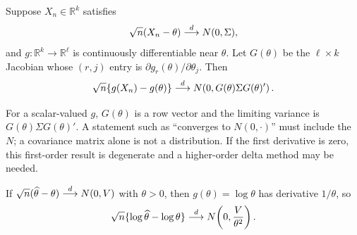 \begin{theorem}
Suppose $X_n\in\mathbb R^k$ satisfies
\[
  \sqrt n(X_n-\theta)\overset{d}{\longrightarrow} N(0,\Sigma),
\]
and $g:\mathbb R^k\to\mathbb R^\ell$ is continuously differentiable near
$\theta$.  Let $G(\theta)$ be the $\ell\times k$ Jacobian whose $(r,j)$ entry
is $\partial g_r(\theta)/\partial\theta_j$.  Then
\[
  \sqrt n\{g(X_n)-g(\theta)\}
  \overset{d}{\longrightarrow} N\!\left(0,G(\theta)\Sigma G(\theta)'\right).
\]
\end{theorem}

For a scalar-valued $g$, $G(\theta)$ is a row vector and the limiting variance
is $G(\theta)\Sigma G(\theta)'$.  A statement such as ``converges to
$N(0,\cdot)$'' must include the $N$; a covariance matrix alone is not a
distribution.  If the first derivative is zero, this first-order result is
degenerate and a higher-order delta method may be needed.

\begin{example}
If $\sqrt n(\widehat\theta-\theta)\overset{d}{\longrightarrow} N(0,V)$ with $\theta>0$, then
$g(\theta)=\log\theta$ has derivative $1/\theta$, so
\[
  \sqrt n\{\log\widehat\theta-\log\theta\}
  \overset{d}{\longrightarrow} N\!\left(0,\frac{V}{\theta^2}\right).
\]
\end{example}
